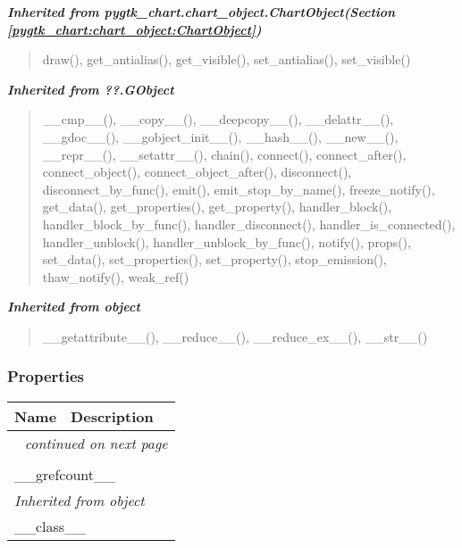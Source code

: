\large{\textbf{\textit{Inherited from pygtk\_chart.chart\_object.ChartObject\textit{(Section \ref{pygtk_chart:chart_object:ChartObject})}}}}

\begin{quote}
draw(), get\_antialias(), get\_visible(), set\_antialias(), set\_visible()
\end{quote}

\large{\textbf{\textit{Inherited from ??.GObject}}}

\begin{quote}
\_\_cmp\_\_(), \_\_copy\_\_(), \_\_deepcopy\_\_(), \_\_delattr\_\_(), \_\_gdoc\_\_(), \_\_gobject\_init\_\_(), \_\_hash\_\_(), \_\_new\_\_(), \_\_repr\_\_(), \_\_setattr\_\_(), chain(), connect(), connect\_after(), connect\_object(), connect\_object\_after(), disconnect(), disconnect\_by\_func(), emit(), emit\_stop\_by\_name(), freeze\_notify(), get\_data(), get\_properties(), get\_property(), handler\_block(), handler\_block\_by\_func(), handler\_disconnect(), handler\_is\_connected(), handler\_unblock(), handler\_unblock\_by\_func(), notify(), props(), set\_data(), set\_properties(), set\_property(), stop\_emission(), thaw\_notify(), weak\_ref()
\end{quote}

\large{\textbf{\textit{Inherited from object}}}

\begin{quote}
\_\_getattribute\_\_(), \_\_reduce\_\_(), \_\_reduce\_ex\_\_(), \_\_str\_\_()
\end{quote}


  \subsubsection{Properties}

    \vspace{-1cm}
\hspace{\varindent}\begin{longtable}{|p{\varnamewidth}|p{\vardescrwidth}|l}
\cline{1-2}
\cline{1-2} \centering \textbf{Name} & \centering \textbf{Description}& \\
\cline{1-2}
\endhead\cline{1-2}\multicolumn{3}{r}{\small\textit{continued on next page}}\\\endfoot\cline{1-2}
\endlastfoot\multicolumn{2}{|l|}{\textit{Inherited from ??.GObject}}\\
\multicolumn{2}{|p{\varwidth}|}{\raggedright \_\_grefcount\_\_}\\
\cline{1-2}
\multicolumn{2}{|l|}{\textit{Inherited from object}}\\
\multicolumn{2}{|p{\varwidth}|}{\raggedright \_\_class\_\_}\\
\cline{1-2}
\end{longtable}


